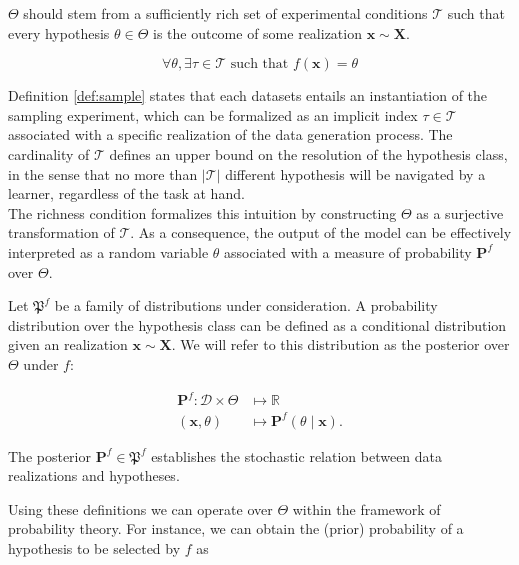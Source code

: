 \begin{proposition}
    $\Theta$ should stem from a
    sufficiently rich set of experimental conditions $\mathcal{T}$ such that every hypothesis $\theta \in \Theta$
    is the outcome of some realization $\bm{x} \sim \bm{X}$.

    $$
    \forall \theta, \exists \tau \in \mathcal{T} \text{ such that } f(\bm{x}) = \theta
    $$
\end{proposition}

Definition \ref{def:sample} states that each datasets entails an instantiation of the sampling 
experiment, which can be formalized as an implicit index $\tau \in \mathcal{T}$ associated with a 
specific realization of the data generation process. The cardinality of $\mathcal{T}$ 
defines an upper bound on the resolution of the hypothesis class, in the sense that no more 
than $|\mathcal{T}|$ different hypothesis will be navigated by a learner, regardless of the task at hand. \\


The richness condition formalizes this intuition by constructing $\Theta$ as a surjective transformation 
of $\mathcal{T}$. As a consequence, the output of the model can be effectively interpreted as a random
variable $\theta$ associated with a measure of probability $\mathbf{P}^f$ over $\Theta$. \\

\begin{definition}\label{def:posterior}
    Let $\mathfrak{P}^f$ be a family of distributions under consideration.
    A probability distribution over the hypothesis class can be defined as a 
    conditional distribution given an realization $\bm{x} \sim \bm{X}$. 
    We will refer to this distribution as the posterior over $\Theta$ under $f$:

    $$
        \begin{aligned}
            \mathbf{P}^f: \mathcal{D} \times \Theta & \longmapsto \mathbb{R} \\
            (\bm{x}, \theta) & \longmapsto \mathbf{P}^f (\theta \mid \bm{x}).
        \end{aligned}
    $$

    The posterior $\mathbf{P}^f \in \mathfrak{P}^f$ establishes the stochastic relation between data realizations and hypotheses.
    
\end{definition}

Using these definitions we can operate over $\Theta$ within the framework of probability 
theory. For instance, we can obtain the (prior) probability of a hypothesis to be
selected by $f$ as


